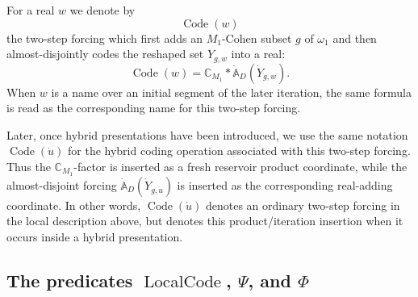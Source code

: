\documentclass[a4paper,11pt]{article}
\begin{document}
For a real $w$ we denote by
\[
   \operatorname{Code}(w)
\]
the two-step forcing which first adds an $M_1$-Cohen subset $g$ of $\omega_1$ and then almost-disjointly codes the reshaped set $Y_{g,w}$ into a real:
\[
   \operatorname{Code}(w)=
   \mathbb C_{M_1}*\dot{\mathbb A}_D(\dot Y_{\dot g,w}).
\]
When $w$ is a name over an initial segment of the later iteration, the same formula is read as the corresponding name for this two-step forcing.

Later, once hybrid presentations have been introduced, we use the same notation
\(\operatorname{Code}(\dot u)\) for the hybrid coding operation associated with
this two-step forcing.  Thus the \(\mathbb C_{M_1}\)-factor is inserted as a
fresh reservoir product coordinate, while the almost-disjoint forcing
\(\dot{\mathbb A}_D(\dot Y_{\dot g,\dot u})\) is inserted as the corresponding
real-adding coordinate.  In other words, \(\operatorname{Code}(\dot u)\) denotes
an ordinary two-step forcing in the local description above, but denotes this
product/iteration insertion when it occurs inside a hybrid presentation.

\subsection{The predicates $\operatorname{LocalCode}$, $\Psi$, and $\Phi$}
\end{document}
